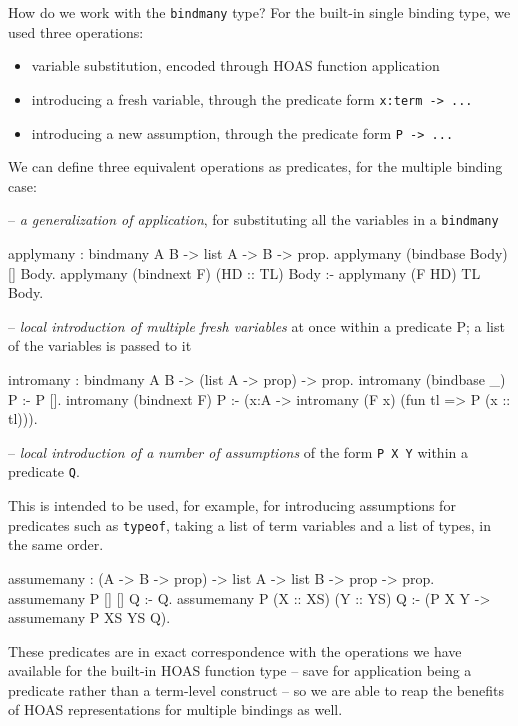 \documentclass[format=acmlarge,review,anonymous]{acmart}\settopmatter{printfolios=true}
\begin{document}
How do we work with the \texttt{bindmany} type? For the built-in single
binding type, we used three operations:

\begin{itemize}
\itemsep1pt\parskip0pt
\item
  variable substitution, encoded through HOAS function application
\item
  introducing a fresh variable, through the predicate form
  \texttt{x:term -> ...}
\item
  introducing a new assumption, through the predicate form
  \texttt{P -> ...}
\end{itemize}

We can define three equivalent operations as predicates, for the
multiple binding case:

-- \textit{a generalization of application}, for substituting all the variables in
  a \texttt{bindmany}

\begin{codequote}
applymany : bindmany A B -> list A -> B -> prop.
applymany (bindbase Body) [] Body.
applymany (bindnext F) (HD :: TL) Body :-
  applymany (F HD) TL Body.
\end{codequote}

-- \textit{local introduction of multiple fresh variables} at once within a
  predicate P; a list of the variables is passed to it

\begin{codequote}
intromany : bindmany A B -> (list A -> prop) -> prop.
intromany (bindbase _) P :- P [].
intromany (bindnext F) P :-
  (x:A -> intromany (F x) (fun tl => P (x :: tl))).
\end{codequote}

-- \textit{local introduction of a number of assumptions} of the form
  \texttt{P X Y} within a predicate \texttt{Q}. 

This is intended to be used, for example, for introducing assumptions for predicates such as
\texttt{typeof}, taking a list of term variables and a list of types, in the same order.

\begin{codequote}
assumemany : (A -> B -> prop) -> list A -> list B -> prop -> prop.
assumemany P [] [] Q :- Q.
assumemany P (X :: XS) (Y :: YS) Q :- (P X Y -> assumemany P XS YS Q).
\end{codequote}

These predicates are in exact correspondence with the operations we have
available for the built-in HOAS function type -- save for application
being a predicate rather than a term-level construct -- so we are able
to reap the benefits of HOAS representations for multiple bindings as
well.
\end{document}

